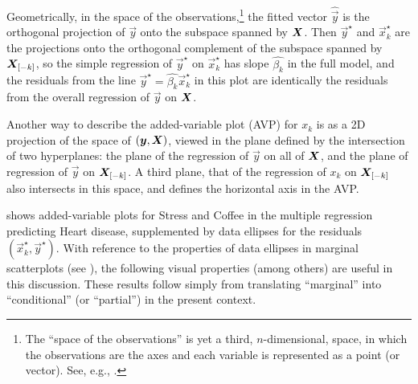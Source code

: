 Geometrically, in the space of the observations,\footnote{The ``space of the observations'' is yet a third, $n$-dimensional, space, in which the observations are the axes and each variable is represented as a point (or vector). See, e.g., \citet[Ch.~10]{Fox:2008}.} the fitted vector $\widehat{\vec{y}}$ is the orthogonal projection of $\vec{y}$
onto the subspace spanned by $\bm{X}$. Then $\vec{y}^\star$ and $\vec{x}^\star_k$ are the projections onto
the orthogonal complement of the subspace spanned by $\bm{X}_{[-k]}$, so
the simple regression of $\vec{y}^\star$ on $\vec{x}^\star_k$ has slope $\hat{\beta_k}$ in the full model,
and the residuals from the line $\vec{y}^\star = \hat{\beta_k} \vec{x}^\star_k$ in this plot are identically
the residuals from the overall regression of $\vec{y}$ on $\bm{X}$.

Another way to describe the added-variable plot (AVP) for $x_k$ is as a 2D projection of the space of
$(\bm{y}, \bm{X})$, viewed in the plane defined by the intersection of two hyperplanes:
the plane of the regression of $\vec{y}$ on all of $\bm{X}$, and the plane of regression of
$\vec{y}$ on $\bm{X}_{[-k]}$. A third plane, that of the regression of $x_k$ on $\bm{X}_{[-k]}$
also intersects in this space, and defines the horizontal axis in the AVP.


 shows added-variable plots for Stress and Coffee in the multiple regression predicting Heart disease,
supplemented by data ellipses for the residuals $(\vec{x}_k^\star, \vec{y}^\star)$.  With reference to the properties
of data ellipses in marginal scatterplots (see ), the following visual properties (among others)
are useful in this discussion.  These results follow simply from translating ``marginal'' into ``conditional'' (or ``partial'')
in the present context.

